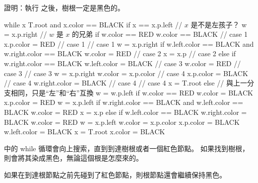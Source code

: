 \startEXERCISE
證明：執行  之後，樹根一定是黑色的。

\startCLRSCODE
while x \ne T.root and x.color == BLACK
	if x == x.p.left		// $x$ 是不是左孩子？
		w = x.p.right		// $w$ 是 $x$ 的兄弟
		if w.color == RED
			w.color == BLACK \hfill // case 1
			x.p.color = RED \hfill // case 1
			 \hfill // case 1
			w = x.p.right
		if w.left.color == BLACK and w.right.color == BLACK
			w.color = RED \hfill // case 2
			x = x.p \hfill // case 2
		else
			if w.right.color == BLACK
				w.left.color = BLACK \hfill // case 3
				w.color = RED \hfill // case 3
				 \hfill // case 3
				w = x.p.right
			w.color = x.p.color \hfill // case 4
			x.p.color = BLACK \hfill // case 4
			w.right.color = BLACK \hfill // case 4
			 \hfill // case 4
			x = T.root
	else // 與上一分支相同，只是“左”和“右”互換
		w = w.p.left
		if w.color == RED
			w.color = BLACK
			x.p.color = RED
			w = x.p.left
		if w.right.color == BLACK and w.left.color == BLACK
			w.color = RED
			x = x.p
		else
			if w.left.color == BLACK
				w.right.color = BLACK
				w.color = RED
				w = x.p.left
			w.color = x.p.color
			x.p.color = BLACK
			w.left.color = BLACK
			x = T.root
x.color = BLACK
\stopCLRSCODE
\stopEXERCISE

\startANSWER
{} 中的 while 循環會向上搜索，直到到達樹根或者一個紅色節點。
如果找到樹根，則會將其染成黑色，無論這個根是怎麼來的。

如果在到達根節點之前先碰到了紅色節點，則根節點還會繼續保持黑色。
\stopANSWER
